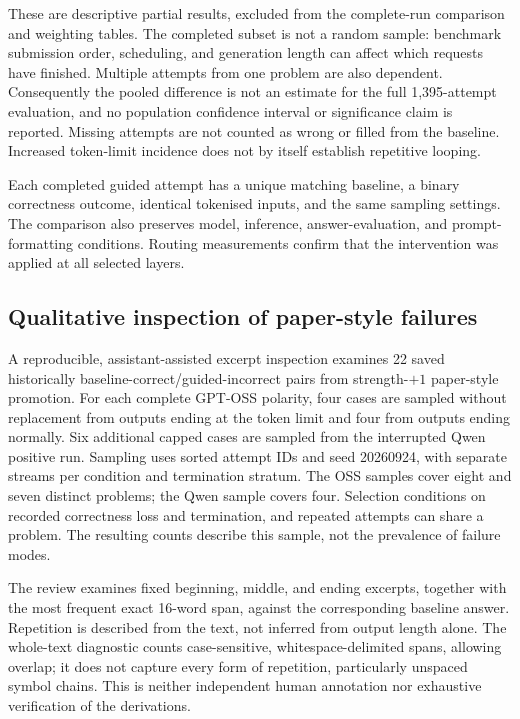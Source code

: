 \documentclass[12pt,a4paper,twoside,openright]{book}
\begin{document}
These are descriptive partial results, excluded from the complete-run comparison and weighting tables. The completed subset is not a random sample: benchmark submission order, scheduling, and generation length can affect which requests have finished. Multiple attempts from one problem are also dependent. Consequently the pooled difference is not an estimate for the full 1,395-attempt evaluation, and no population confidence interval or significance claim is reported. Missing attempts are not counted as wrong or filled from the baseline. Increased token-limit incidence does not by itself establish repetitive looping.

Each completed guided attempt has a unique matching baseline, a binary
correctness outcome, identical tokenised inputs, and the same sampling
settings. The comparison also preserves model, inference, answer-evaluation,
and prompt-formatting conditions. Routing measurements confirm that the
intervention was applied at all selected layers.

\subsection{Qualitative inspection of paper-style failures}
\label{sec:paper-failure-inspection}

A reproducible, assistant-assisted excerpt inspection examines 22 saved
historically baseline-correct/guided-incorrect pairs from strength-$+1$ paper-style
promotion. For each complete GPT-OSS polarity, four cases are sampled
without replacement from outputs ending at the token limit and four from
outputs ending normally. Six additional capped cases are sampled from the
interrupted Qwen positive run. Sampling uses sorted attempt IDs and seed
20260924, with separate streams per condition and termination stratum.
The OSS samples cover eight and seven distinct problems; the Qwen sample
covers four. Selection conditions on recorded correctness loss and
termination, and repeated attempts can share a problem. The resulting
counts describe this sample, not the prevalence of failure modes.

The review examines fixed beginning, middle, and ending excerpts, together
with the most frequent exact 16-word span, against the corresponding
baseline answer. Repetition is described from the text, not inferred from
output length alone. The whole-text diagnostic counts case-sensitive,
whitespace-delimited spans, allowing overlap; it does not capture every
form of repetition, particularly unspaced symbol chains. This is neither
independent human annotation nor exhaustive verification of the derivations.
\end{document}
